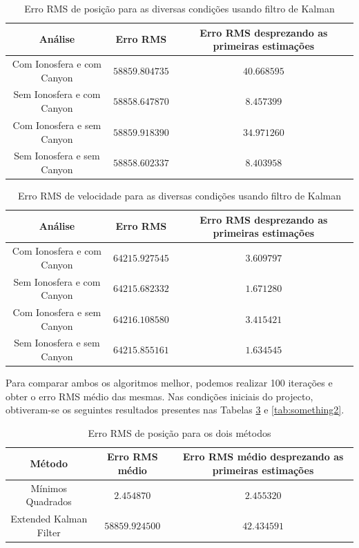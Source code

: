 \documentclass[palatino]{ist-report}
\begin{document}
\begin{table}[ht]
    \centering
    \begin{tabular}{c c c}\toprule
        \textbf{Análise} & \textbf{Erro RMS} &\textbf{Erro RMS desprezando as primeiras estimações}\\
        \midrule
        Com Ionosfera e com Canyon & $58859.804735$ & $40.668595$\\
        Sem Ionosfera e com Canyon & $58858.647870$ & $8.457399$\\
        Com Ionosfera e sem Canyon & $58859.918390$ & $34.971260$\\
        Sem Ionosfera e sem Canyon & $58858.602337$ & $8.403958$ \\
        \bottomrule
    \end{tabular}
    \caption{Erro RMS de posição para as diversas condições usando filtro de Kalman}
    \label{tab:something}
\end{table}

\begin{table}[ht]
    \centering
    \begin{tabular}{c c c}\toprule
        \textbf{Análise} & \textbf{Erro RMS} &\textbf{Erro RMS desprezando as primeiras estimações}\\
        \midrule
        Com Ionosfera e com Canyon & $64215.927545$ & $3.609797$\\
        Sem Ionosfera e com Canyon & $64215.682332$ & $1.671280$\\
        Com Ionosfera e sem Canyon & $64216.108580$ & $3.415421$\\
        Sem Ionosfera e sem Canyon & $64215.855161$ & $1.634545$ \\
        \bottomrule
    \end{tabular}
    \caption{Erro RMS de velocidade para as diversas condições usando filtro de Kalman}
    \label{tab:something}
\end{table}

Para comparar ambos os algoritmos melhor, podemos realizar 100 iterações e obter o erro RMS médio das mesmas. Nas condições iniciais do projecto, obtiveram-se os seguintes resultados presentes nas Tabelas \ref{tab:something1} e \ref{tab:something2}.
\begin{table}[ht]
    \centering
    \begin{tabular}{c c c}\toprule
        \textbf{Método} & \textbf{Erro RMS médio} &\textbf{Erro RMS médio desprezando as primeiras estimações}\\
        \midrule
        Mínimos Quadrados & $2.454870$ & $2.455320$\\
        Extended Kalman Filter & $58859.924500$ & $42.434591$\\
        \bottomrule
    \end{tabular}
    \caption{Erro RMS de posição para os dois métodos}
    \label{tab:something1}
\end{table}
\end{document}
